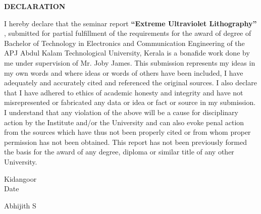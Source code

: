 \documentclass[12pt,a4paper]{report}
\begin{document}
\thispagestyle{empty}
\newpage
\begin{center}
\textbf{DECLARATION}\\
\end{center}
I hereby declare that the seminar report \textbf{“Extreme Ultraviolet Lithography”} , 
submitted for partial fulfillment of the requirements for the award of degree of 
Bachelor of Technology in Electronics and Communication Engineering of the APJ 
Abdul Kalam Technological University, Kerala is a bonafide work done by me
under supervision of Mr. Joby James. This submission represents my ideas in
 my own words and where ideas or words of others have been included, I 
 have adequately and accurately cited and referenced the original sources. 
 I also declare that I have adhered to ethics of academic honesty and 
 integrity and have not misrepresented or fabricated any data or idea 
 or fact or source in my submission. I understand that any violation 
 of the above will be a cause for disciplinary action by the Institute 
 and/or the University and can also evoke penal action from the sources 
 which have thus not been properly cited or from whom proper permission 
 has not been obtained. This report has not been previously formed the 
 basis for the award of any degree, diploma or similar title of any other 
 University.

\noindent \begin{minipage}{0.45\linewidth}
\begin{flushleft}
\vspace{1 cm}
                         
Kidangoor \\
Date\\

\end{flushleft} 
\end{minipage}
\hfill
\begin{minipage}{0.45\linewidth}
\begin{flushright}                                      
\vspace{1cm}
                         
Abhijith S\\


\end{flushright} 
\end{minipage}

\thispagestyle{empty}
\end{document}
